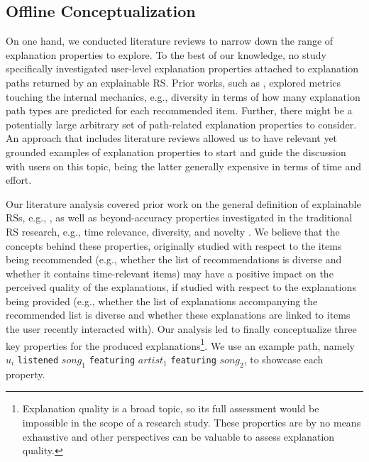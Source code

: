 \documentclass[sigconf]{acmart}
\begin{document}
\subsection{Offline Conceptualization}\label{subsec:conceptualization}
On one hand, we conducted literature reviews to narrow down the range of explanation properties to explore. To the best of our knowledge, no study specifically investigated user-level explanation properties attached to explanation paths returned by an explainable RS. Prior works, such as \cite{FuXGZHGXGSZM20}, explored metrics touching the internal mechanics, e.g., diversity in terms of how many explanation path types are predicted for each recommended item. Further, there might be a potentially large arbitrary set of path-related explanation properties to consider. An approach that includes literature reviews allowed us to have relevant yet grounded examples of explanation properties to start and guide the discussion with users on this topic, being the latter generally expensive in terms of time and effort. 

Our literature analysis covered prior work on the general definition of explainable RSs, e.g., \cite{Tintarev2007}, as well as beyond-accuracy properties investigated in the traditional RS research, e.g., time relevance, diversity, and novelty \cite{DBLP:journals/tiis/KaminskasB17}. We believe that the concepts behind these properties, originally studied with respect to the items being recommended (e.g.,  whether the list of recommendations is diverse and whether it contains time-relevant items) may have a positive impact on the perceived quality of the explanations, if studied with respect to the explanations being provided (e.g., whether the list of explanations accompanying the recommended list is diverse and whether these explanations are linked to items the user recently interacted with). Our analysis led to finally conceptualize three key properties for the produced explanations\footnote{
Explanation quality is a broad topic, so its full assessment would be impossible in the scope of a research study. These properties are by no means exhaustive and other perspectives can be valuable to assess explanation quality.}. We use an example path, namely $u_i$ \texttt{listened} $song_1$ \texttt{featuring} $artist_1$ \texttt{featuring} $song_2$, to showcase each property. 
\end{document}
